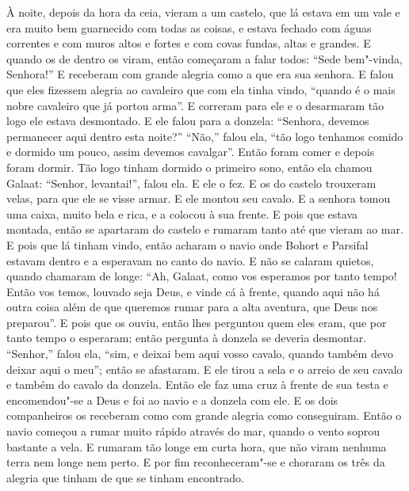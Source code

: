 À noite, depois da hora da ceia, vieram a um castelo, que lá estava em um vale e
era muito bem guarnecido com todas as coisas, e estava fechado com águas
correntes e com muros altos e fortes e com covas fundas, altas e grandes. E
quando os de dentro os viram, então começaram a falar todos: “Sede bem"-vinda,
Senhora!” E receberam com grande alegria como a que era sua senhora. E falou
que eles fizessem alegria ao cavaleiro que com ela tinha vindo, “quando é o
mais nobre cavaleiro que já portou arma”. E correram para ele e o desarmaram
tão logo ele estava desmontado. E ele falou para a donzela: “Senhora, devemos
permanecer aqui dentro esta noite?” “Não,” falou ela, “tão logo tenhamos
comido e dormido um pouco, assim devemos cavalgar”. Então foram comer e depois
foram dormir. Tão logo tinham dormido o primeiro sono, então ela chamou Galaat:
“Senhor, levantai!”, falou ela. E ele o fez. E os do castelo trouxeram velas,
para que ele se visse armar. E ele montou seu cavalo. E a senhora tomou uma
caixa, muito bela e rica, e a colocou à sua frente. E pois que estava montada,
então se apartaram do castelo e rumaram tanto até que vieram ao mar. E pois que
lá tinham vindo, então acharam o navio onde Bohort e Parsifal estavam dentro e
a esperavam no canto do navio. E não se calaram quietos, quando chamaram de
longe: “Ah, Galaat, como vos esperamos por tanto tempo! Então vos temos,
louvado seja Deus, e vinde cá à frente, quando aqui não há outra coisa além de
que queremos rumar para a alta aventura, que Deus nos preparou”. E pois que os
ouviu, então lhes perguntou quem eles eram, que por tanto tempo o esperaram;
então pergunta à donzela se deveria desmontar. “Senhor,” falou ela, “sim, e
deixai bem aqui vosso cavalo, quando também devo deixar aqui o meu”; então se
afastaram. E ele tirou a sela e o arreio de seu cavalo e também do cavalo da
donzela. Então ele faz uma cruz à frente de sua testa e encomendou"-se a Deus e
foi ao navio e a donzela com ele. E os dois companheiros os receberam como com
grande alegria como conseguiram. Então o navio começou a rumar muito rápido
através do mar, quando o vento soprou bastante a vela. E rumaram tão longe em
curta hora, que não viram nenhuma terra nem longe nem perto. E por fim
reconheceram"-se e choraram os três da alegria que tinham de que se tinham
encontrado.

